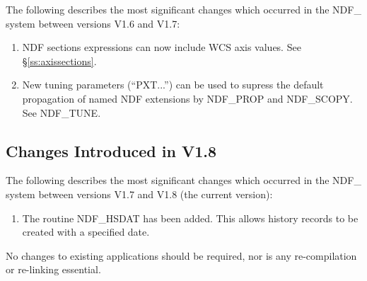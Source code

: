 \documentclass[twoside,11pt]{article}
\newcommand{\htmlref}[2]{#1}
\newcommand{\xlabel}[1]{}
\begin{document}
The following describes the most significant changes which occurred in
the NDF\_ system between versions V1.6 and V1.7:

\begin{enumerate}
\item NDF sections expressions can now include WCS axis values.
See \S\ref{ss:axissections}.

\item New tuning parameters (``PXT...'') can be used to supress the default
propagation of named NDF extensions by NDF\_PROP and NDF\_SCOPY. See 
\htmlref{NDF\_TUNE}{NDF_TUNE}.

\end{enumerate}

\subsection{\xlabel{list_of_most_recent_changes}Changes Introduced in V1.8}

The following describes the most significant changes which occurred in
the NDF\_ system between versions V1.7 and V1.8 (the current version):

\begin{enumerate}
\item The routine NDF\_HSDAT has been added. This allows history records
to be created with a specified date.

\end{enumerate}

No changes to existing applications should be required, nor is any
re-compilation or re-linking essential.

\end{document}
